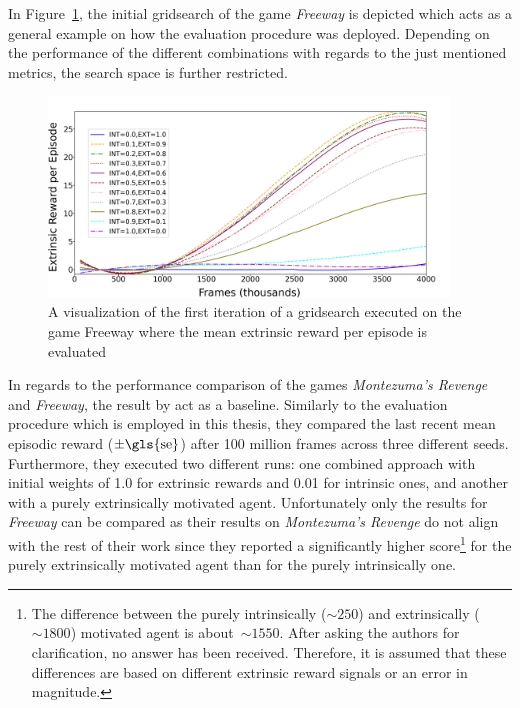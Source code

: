 \documentclass[draft,final]{vutinfth} %
\begin{document}
    In Figure~\ref{fig:gridsearch_evaluation}, the initial gridsearch of the game \textit{Freeway} is depicted which acts as a general example on how the evaluation procedure was deployed.
    Depending on the performance of the different combinations with regards to the just mentioned metrics, the search space is further restricted.

    \begin{figure}[h]
        \centering
        \includegraphics[width=0.95\textwidth]{figures/example_grid_search.png}
        \caption[A visualization of the first iteration of an executed gridsearch for the game Freeway]{A visualization of the first iteration of a gridsearch executed on the game Freeway where the mean extrinsic reward per episode is evaluated}
        \label{fig:gridsearch_evaluation}
    \end{figure}

    In regards to the performance comparison of the games \textit{Montezuma's Revenge} and \textit{Freeway}, the result by \citet[see Table 2]{burda_large-scale_2018-1} act as a baseline.
    Similarly to the evaluation procedure which is employed in this thesis, they compared the last recent mean episodic reward ($\pm\text{\gls{se}}$) after 100 million frames across three different seeds.
    Furthermore, they executed two different runs: one combined approach with initial weights of 1.0 for extrinsic rewards and 0.01 for intrinsic ones, and another with a purely extrinsically motivated agent.
    Unfortunately only the results for \textit{Freeway} can be compared as their results on \textit{Montezuma's Revenge} do not align with the rest of their work since they reported a significantly higher score\footnote{The difference between the purely intrinsically ($\sim250$) and extrinsically ($\sim1800$) motivated agent is about~$\sim1550$. After asking the authors \citet{burda_large-scale_2018-1} for clarification, no answer has been received. Therefore, it is assumed that these differences are based on different extrinsic reward signals or an error in magnitude.} for the purely extrinsically motivated agent than for the purely intrinsically one.
\end{document}
